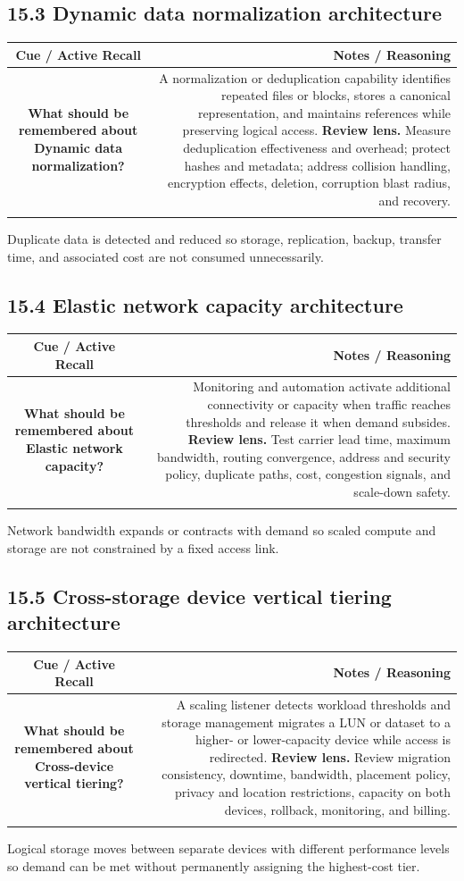\documentclass[11pt]{article}
\newcommand{\CornellHeader}{\rowcolor{Navy}\color{white}\bfseries Cue / Active Recall & \color{white}\bfseries Notes / Reasoning \\\endhead}
\newcommand{\CornellRow}[2]{\cellcolor{CueGray}\textbf{#1} & #2 \\\addlinespace[3pt]}
\begin{document}
\subsection{15.3 Dynamic data normalization architecture}
\begin{longtable}{@{}C N@{}}
\CornellHeader
\CornellRow{What should be remembered about Dynamic data normalization?}{A normalization or deduplication capability identifies repeated files or blocks, stores a canonical representation, and maintains references while preserving logical access. \textbf{Review lens.} Measure deduplication effectiveness and overhead; protect hashes and metadata; address collision handling, encryption effects, deletion, corruption blast radius, and recovery.}
\end{longtable}
\begin{sectionsummarybox}
Duplicate data is detected and reduced so storage, replication, backup, transfer time, and associated cost are not consumed unnecessarily.
\end{sectionsummarybox}
\subsection{15.4 Elastic network capacity architecture}
\begin{longtable}{@{}C N@{}}
\CornellHeader
\CornellRow{What should be remembered about Elastic network capacity?}{Monitoring and automation activate additional connectivity or capacity when traffic reaches thresholds and release it when demand subsides. \textbf{Review lens.} Test carrier lead time, maximum bandwidth, routing convergence, address and security policy, duplicate paths, cost, congestion signals, and scale-down safety.}
\end{longtable}
\begin{sectionsummarybox}
Network bandwidth expands or contracts with demand so scaled compute and storage are not constrained by a fixed access link.
\end{sectionsummarybox}
\subsection{15.5 Cross-storage device vertical tiering architecture}
\begin{longtable}{@{}C N@{}}
\CornellHeader
\CornellRow{What should be remembered about Cross-device vertical tiering?}{A scaling listener detects workload thresholds and storage management migrates a LUN or dataset to a higher- or lower-capacity device while access is redirected. \textbf{Review lens.} Review migration consistency, downtime, bandwidth, placement policy, privacy and location restrictions, capacity on both devices, rollback, monitoring, and billing.}
\end{longtable}
\begin{sectionsummarybox}
Logical storage moves between separate devices with different performance levels so demand can be met without permanently assigning the highest-cost tier.
\end{sectionsummarybox}
\end{document}
